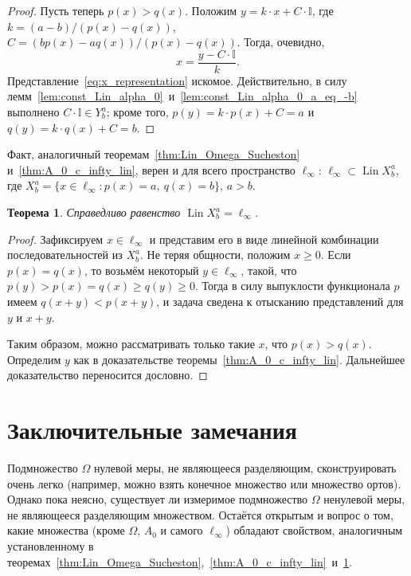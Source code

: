 \documentclass{article}
\theoremstyle{plain}
\newtheorem{theorem}{Теорема}
\theoremstyle{definition}
\newtheorem{proof}{Доказательство}\def\theproof{}
\begin{document}
\begin{fulltext}
\begin{proof}
	Пусть теперь $p(x) > q(x)$.
	Положим $y=k\cdot x + C\cdot\mathbb{I}$,
	где $k=({a-b})/({p(x)-q(x)})$, $C=({bp(x)-aq(x)})/({p(x)-q(x)})$.
	Тогда, очевидно,
	\begin{equation}
		\label{eq:x_representation}
		x=\frac{y-C\cdot\mathbb{I}}{k}
		.
	\end{equation}
	Представление~\eqref{eq:x_representation} искомое.
	Действительно, в силу лемм~\ref{lem:const_Lin_alpha_0}~и~\ref{lem:const_Lin_alpha_0_a_eq_-b} выполнено
	$C\cdot\mathbb{I}\in Y^a_b$; кроме того, $p(y) = k\cdot p(x) + C = a$ и $q(y) = k\cdot q(x) + C = b$.
\end{proof}

Факт, аналогичный теоремам~\ref{thm:Lin_Omega_Sucheston} и~\ref{thm:A_0_c_infty_lin}, верен и для
всего пространство $\ell_\infty$:
$\ell_\infty\subset \operatorname{Lin} X^a_b$, где
$X^a_b = \{x\in\ell_\infty : p(x) = a,\ q(x) = b\}$, $a>b$.



\begin{theorem}
	\label{thm:Lin_ell_infty}
	Справедливо равенство $\operatorname{Lin} X^a_b = \ell_\infty$.
\end{theorem}

\begin{proof}
	Зафиксируем $x \in \ell_\infty$ и представим его в виде линейной комбинации последовательностей из $X^a_b$.
	Не теряя общности, положим $x\geq 0$.
	Если $p(x) = q(x)$, то возьмём некоторый $y\in\ell_\infty$,
	такой, что $p(y) > p(x) = q(x)  \geq q(y) \geq 0$.
	Тогда в силу выпуклости функционала $p$ имеем
	$
		q(x+y) < p(x+y)
	$,
	и задача сведена к отысканию представлений для $y$ и $x+y$.
	
	Таким образом, можно рассматривать только такие $x$, что $p(x) > q(x)$.
	Определим $y$ как в доказательстве теоремы~\ref{thm:A_0_c_infty_lin}.
	Дальнейшее доказательство переносится дословно.
\end{proof}

\section{Заключительные замечания}
Подмножество $\Omega$ нулевой меры, не являющееся разделяющим, сконструировать очень легко
(например, можно взять конечное множество или множество ортов).
Однако пока неясно, существует ли измеримое подмножество $\Omega$ ненулевой меры,
не являющееся разделяющим множеством.
Остаётся открытым и вопрос о том, какие множества (кроме $\Omega$, $A_0$ и самого $\ell_\infty$)
обладают свойством, аналогичным установленному в теоремах~\ref{thm:Lin_Omega_Sucheston},~\ref{thm:A_0_c_infty_lin}~и~\ref{thm:Lin_ell_infty}.


\end{fulltext}
\end{document}
